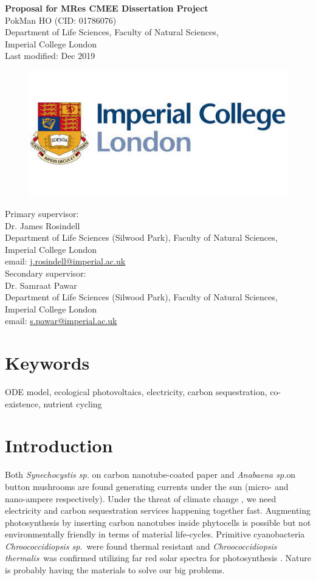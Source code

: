\documentclass[a4paper, 11pt]{article}
\title{\ReportTitle}
\author{\ReportAuthor}
\date{}
\newcommand{\ReportTitle}{Proposal for MRes CMEE Dissertation Project}
\newcommand{\ReportAuthor}{PokMan HO (CID: 01786076)}
\newcommand{\ReportAffil}{Department of Life Sciences, Faculty of Natural Sciences,\\Imperial College London}
\newcommand{\As}{\textit{Anabaena sp.}}
\newcommand{\Ct}{\textit{Chroococcidiopsis thermalis}}
\newcommand{\Cs}{\textit{Chroococcidiopsis sp.}}
\begin{document}
	\begin{center}
		\Huge\textbf{\ReportTitle}\\
		\LARGE\ReportAuthor\\
		\Large\ReportAffil\\
		\Large{Last modified: Dec 2019}
	\end{center}
	\begin{figure}[h]
		\centering\includegraphics[width=\linewidth]{icl.jpg}
	\end{figure}
Primary supervisor:\\
\indent Dr. James Rosindell\\
\indent Department of Life Sciences (Silwood Park), Faculty of Natural Sciences, Imperial College London\\
\indent email: \href{mailto:j.rosindell@imperial.ac.uk}{j.rosindell@imperial.ac.uk}\\
Secondary supervisor:\\
\indent Dr. Samraat Pawar\\
\indent Department of Life Sciences (Silwood Park), Faculty of Natural Sciences, Imperial College London\\
\indent email: \href{mailto:s.pawar@imperial.ac.uk}{s.pawar@imperial.ac.uk}
\clearpage
\section{Keywords}
ODE model, ecological photovoltaics, electricity, carbon sequestration, co-existence, nutrient cycling
\section{Introduction}
Both \textit{Synechocystis sp.} on carbon nanotube-coated paper \autocite{sawa2017electricity} and \As on button mushrooms \autocite{joshi2018bacterial} are found generating currents under the sun (micro- and nano-ampere respectively).  Under the threat of climate change \autocite{schuur2015climate}, we need electricity and carbon sequestration services happening together fast.  Augmenting photosynthesis by inserting carbon nanotubes inside phytocells \autocite{giraldo2014plant} is possible but not environmentally friendly in terms of material life-cycles.  Primitive cyanobacteria \Cs\ were found thermal resistant \autocite{baque2013boss} and \Ct\ was confirmed utilizing far red solar spectra for photosynthesis \autocite{nurnberg2018photochemistry}.  Nature is probably having the materials to solve our big problems.\\
\end{document}

